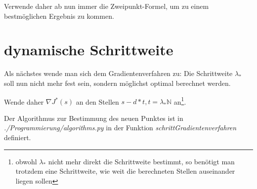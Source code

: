 \documentclass[a4paper,12pt]{report}
\newcommand{\N}{\mathbb N}
\newcommand{\1}{\mathds{1}}
\theoremstyle{plain} %
\theoremstyle{definition} %
\theoremstyle{remark}
\begin{document}
            Verwende daher ab nun immer die Zweipunkt-Formel, um zu einem bestmöglichen Ergebnis zu kommen.

      \section{dynamische Schrittweite}
            Als nächstes wende man sich dem Gradientenverfahren zu:
            Die Schrittweite $\lambda_*$ soll nun nicht mehr fest sein, sondern möglichst optimal berechnet werden.

            Wende daher $\nabla J^*(s)$ an den Stellen $s-d*t, t=\lambda_*\N$ an\footnote{obwohl $\lambda_*$ nicht mehr direkt die Schrittweite bestimmt, so benötigt man trotzdem eine Schrittweite, wie weit die berechneten Stellen auseinander liegen sollen}.

            Der Algorithmus zur Bestimmung des neuen Punktes ist in \textit{./Programmierung/algorithms.py} in der Funktion \textit{schrittGradientenverfahren} definiert.

\end{document}

